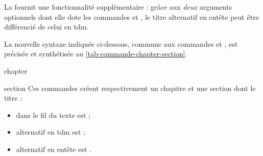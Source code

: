 La \yatCl{} fournit une fonctionnalité supplémentaire : grâce aux \emph{deux}
arguments optionnels dont elle dote les commandes  et
, le titre alternatif en entête peut être différencié de
celui en \gls{tdm}\signet{}.

La nouvelle syntaxe indiquée ci-dessous, commune aux commandes 
et ,
est précisée et synthétisée au \vref{tab-commande-chapter-section}.

\begin{docCommand}[doc new=2016-12-01]{chapter}{}
\end{docCommand}
%
\begin{docCommand}[doc new=2016-12-01]{section}{}
  Ces commandes créent respectivement un chapitre et une section dont le titre :
  \begin{itemize}
  \item dans le fil du texte est  ;
  \item alternatif en \gls{tdm}\signet{} est  ;
  \item alternatif en entête est .
  \end{itemize}
\end{docCommand}
%
\begin{table}[htb]
  \centering
  \caption{Usage des (deux arguments optionnels des) commandes
    \protect{} et \protect{}%
  }
  \label{tab-commande-chapter-section}
  
\end{table}
